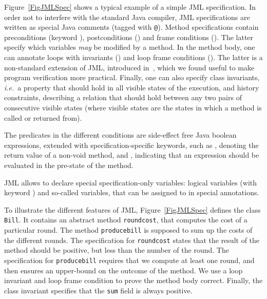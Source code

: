 Figure~\ref{FigJMLSpec} shows a typical example of a simple JML
specification.  In order not to interfere with the standard Java
compiler, JML specifications are written as special Java comments
(tagged with \texttt{@}). Method specifications contain preconditions
(keyword ), postconditions () and
frame conditions (). The latter specify which
variables \emph{may} be modified by a method. In the method body, one
can annotate loops with invariants () and loop
frame conditions (). The latter is a
non-standard extension of JML, introduced in~\cite{BurdyRL03}, which we
found useful to make program verification more practical. Finally, one
can also specify class invariants, \emph{i.e.}\ a property that should
hold in all visible states of the execution, and history constraints,
describing a relation that should hold between any two pairs of
consecutive visible states (where visible states are the states in
which a method is called or returned from). 

The predicates in the different conditions are side-effect free Java
boolean expressions, extended with specification-specific keywords,
such as , denoting the return value of a non-void
method, and , indicating that an expression should be
evaluated in the pre-state of the method.

JML allows to declare special specification-only variables: logical
variables (with keyword ) and so-called 
variables, that can be assigned to in special 
annotations.

To illustrate the different features of JML, Figure~\ref{FigJMLSpec}
defines the class \texttt{Bill}. It contains an abstract method
\texttt{round\unsc cost}, that computes the cost of a particular
round. The method \texttt{produce\unsc bill} is supposed to sum up the
costs of the different rounds. The specification for
\texttt{round\unsc cost} states that the result of the method should be
positive, but less than the number of the round. The specification for
\texttt{produce\unsc bill} requires that we compute at least one
round, and then ensures an upper-bound on the outcome of the
method. We use a loop invariant and loop frame condition to prove the
method body correct. Finally, the class invariant specifies that the
\texttt{sum} field is always positive.
     



